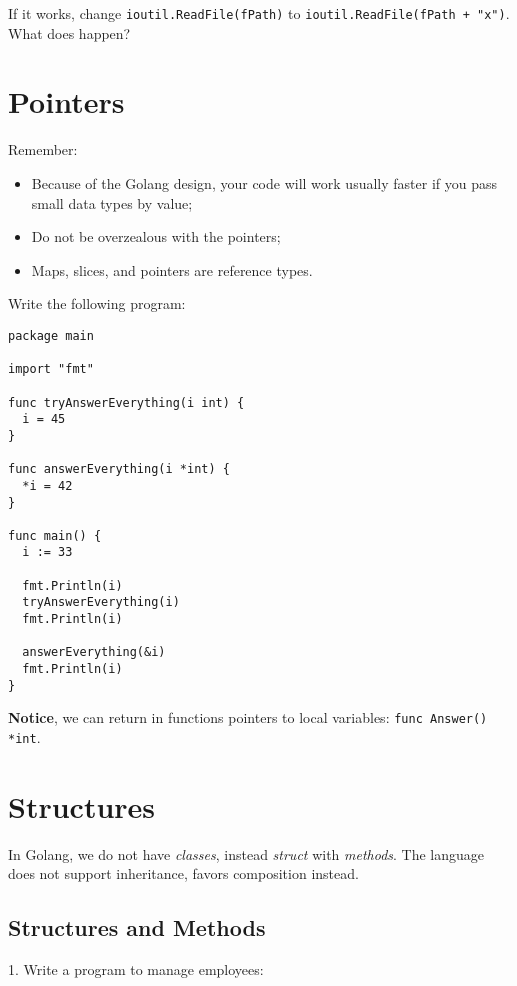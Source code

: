 \documentclass[11pt, letterpaper]{article}
\begin{document}
If it works, change \texttt{ioutil.ReadFile(fPath)} to \texttt{ioutil.ReadFile(fPath + "x")}. What does happen?


\section{Pointers}

Remember:

\begin{itemize}
\item Because of the Golang design, your code will work usually faster if you pass small data types by value;
\item Do not be overzealous with the pointers;
\item Maps, slices, and pointers are reference types.
\end{itemize}

Write the following program:

\begin{verbatim}
package main

import "fmt"

func tryAnswerEverything(i int) {
  i = 45
}

func answerEverything(i *int) {
  *i = 42
}

func main() {
  i := 33

  fmt.Println(i)
  tryAnswerEverything(i)
  fmt.Println(i)

  answerEverything(&i)
  fmt.Println(i)
}
\end{verbatim}

\textbf{Notice}, we can return in functions pointers to local variables: \texttt{func Answer() *int}.

\section{Structures}

In Golang, we do not have \emph{classes}, instead \emph{struct} with \emph{methods}. The language does not support inheritance, favors composition instead.

\subsection{Structures and Methods}

1. Write a program to manage employees:
\end{document}
